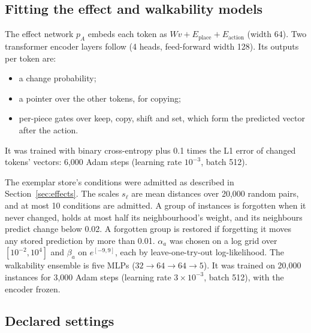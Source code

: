 \documentclass{article}
\begin{document}
\subsection{Fitting the effect and walkability models}

The effect network $p_A$ embeds each token as $W v + E_{\text{place}} + E_{\text{action}}$ (width 64). Two transformer encoder layers follow (4 heads, feed-forward width 128). Its outputs per token are:
\begin{itemize}
    \item a change probability;
    \item a pointer over the other tokens, for copying;
    \item per-piece gates over keep, copy, shift and set, which form the predicted vector after the action.
\end{itemize}
It was trained with binary cross-entropy plus 0.1 times the L1 error of changed tokens' vectors: 6,000 Adam steps (learning rate $10^{-3}$, batch 512).

The exemplar store's conditions were admitted as described in Section~\ref{sec:effects}. The scales $s_\ell$ are mean distances over 20,000 random pairs, and at most 10 conditions are admitted. A group of instances is forgotten when it never changed, holds at most half its neighbourhood's weight, and its neighbours predict change below 0.02. A forgotten group is restored if forgetting it moves any stored prediction by more than 0.01. $\alpha_a$ was chosen on a log grid over $[10^{-2},10^4]$ and $\beta_a$ on $e^{[-9,9]}$, each by leave-one-try-out log-likelihood. The walkability ensemble is five MLPs ($32\to64\to64\to5$). It was trained on 20,000 instances for 3,000 Adam steps (learning rate $3\times10^{-3}$, batch 512), with the encoder frozen.

\subsection{Declared settings}
\end{document}
